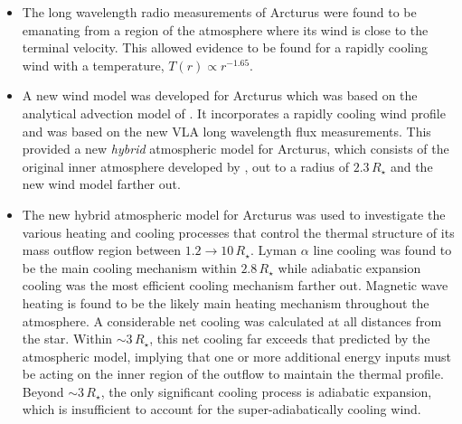 \begin{itemize}
	\item The long wavelength radio measurements of Arcturus were found to be emanating from a region of the atmosphere where its wind is close to the terminal velocity. This allowed evidence to be found for a rapidly cooling wind with a temperature, $T(r) \propto r^{-1.65}$.
	
	\item A new wind model was developed for Arcturus which was based on the analytical advection model of \cite{glassgold_1986}. It incorporates a rapidly cooling wind profile and was based on the new VLA long wavelength flux measurements. This provided a new \textit{hybrid} atmospheric model for Arcturus, which consists of the original inner atmosphere developed by \cite{drake_1985}, out to a radius of $2.3\,R_{\star}$ and the new wind model farther out.

	\item The new hybrid atmospheric model for Arcturus was used to investigate the various heating and cooling processes that control the thermal structure of its mass outflow region between $1.2\rightarrow  10\,R_{\star}$. Lyman $\alpha$ line cooling was found to be the main cooling mechanism within $2.8\,R_{\star}$ while adiabatic expansion cooling was the most efficient cooling mechanism farther out. Magnetic wave heating is found to be the likely main heating mechanism throughout the atmosphere. A considerable net cooling was calculated at all distances from the star. Within $\sim 3\,R_{\star}$, this net cooling far exceeds that predicted by the atmospheric model, implying that one or more additional energy inputs must be acting on the inner region of the outflow to maintain the thermal profile. Beyond $\sim 3\,R_{\star}$, the only significant cooling process is adiabatic expansion, which is insufficient to account for the super-adiabatically cooling wind.

\end{itemize}

